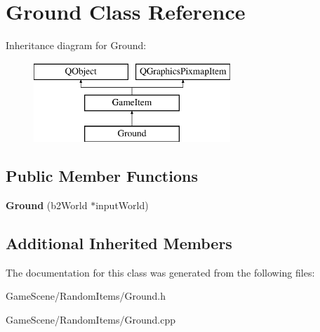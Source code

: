 \hypertarget{classGround}{}\section{Ground Class Reference}
\label{classGround}
Inheritance diagram for Ground\+:\begin{figure}[H]
\begin{center}
\leavevmode
\includegraphics[height=3.000000cm]{classGround}
\end{center}
\end{figure}
\subsection*{Public Member Functions}
\begin{DoxyCompactItemize}
\item 
{\bfseries Ground} (b2\+World $\ast$input\+World)\hypertarget{classGround_ae19f2ed3cb333e1f6e2c03aa76a8726d}{}\label{classGround_ae19f2ed3cb333e1f6e2c03aa76a8726d}

\end{DoxyCompactItemize}
\subsection*{Additional Inherited Members}


The documentation for this class was generated from the following files\+:\begin{DoxyCompactItemize}
\item 
Game\+Scene/\+Random\+Items/Ground.\+h\item 
Game\+Scene/\+Random\+Items/Ground.\+cpp\end{DoxyCompactItemize}
